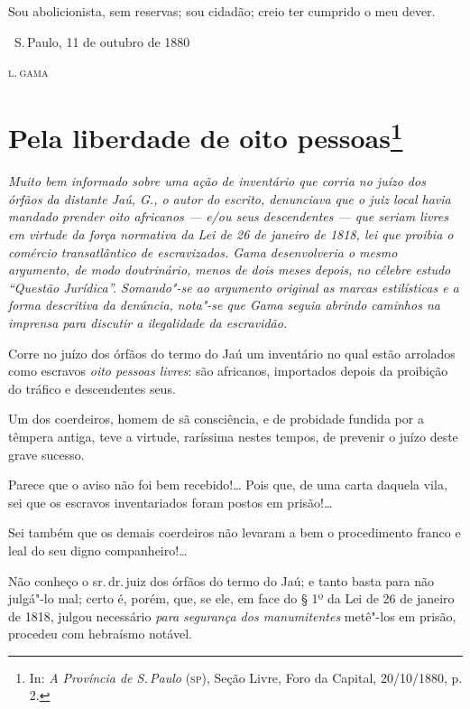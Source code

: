 Sou abolicionista, sem reservas; sou cidadão; creio ter cumprido o meu
dever.

\bigskip

\hfill\ S.\,Paulo, 11 de outubro de 1880\smallskip

\hfill\textsc{l.\,gama}


\chapter{Pela liberdade de oito pessoas\footnote[*]{In: \emph{A Província
  de S.\,Paulo} (\textsc{sp}), Seção Livre, Foro da Capital, 20/10/1880, p. 2.}}

\begin{flushleft}
{\footnotesize\itshape
Muito bem informado sobre uma
ação de inventário que corria no juízo dos órfãos da distante Jaú, G., o
autor do escrito, denunciava que o juiz local havia mandado prender oito
africanos --- e/ou seus descendentes --- que seriam livres em virtude da
força normativa da Lei de 26 de janeiro de 1818, lei que proibia o comércio
transatlântico de escravizados. Gama desenvolveria o mesmo argumento, de
modo doutrinário, menos de dois meses depois, no célebre estudo ``Questão
Jurídica''. Somando"-se ao argumento original as marcas estilísticas e a
forma descritiva da denúncia, nota"-se que Gama seguia abrindo caminhos
na imprensa para discutir a ilegalidade da escravidão. }
\end{flushleft}

\noindent{}Corre no juízo dos órfãos do termo do Jaú um inventário no qual estão
arrolados como escravos \emph{oito pessoas livres}: são africanos,
importados depois da proibição do tráfico e descendentes seus.

Um dos coerdeiros, homem de sã consciência, e de probidade fundida por a
têmpera antiga, teve a virtude, raríssima nestes tempos, de prevenir o
juízo deste grave sucesso.

Parece que o aviso não foi bem recebido!\ldots{} Pois que, de uma carta
daquela vila, sei que os escravos inventariados foram postos em
prisão!\ldots{}

Sei também que os demais coerdeiros não levaram a bem o procedimento
franco e leal do seu digno companheiro!\ldots{}

Não conheço o sr.\,dr.\,juiz dos órfãos do termo do Jaú; e tanto basta
para não julgá"-lo mal; certo é, porém, que, se ele, em face do § 1º da
Lei de 26 de janeiro de 1818, julgou necessário \emph{para segurança dos
manumitentes} metê"-los em prisão, procedeu com hebraísmo notável.

